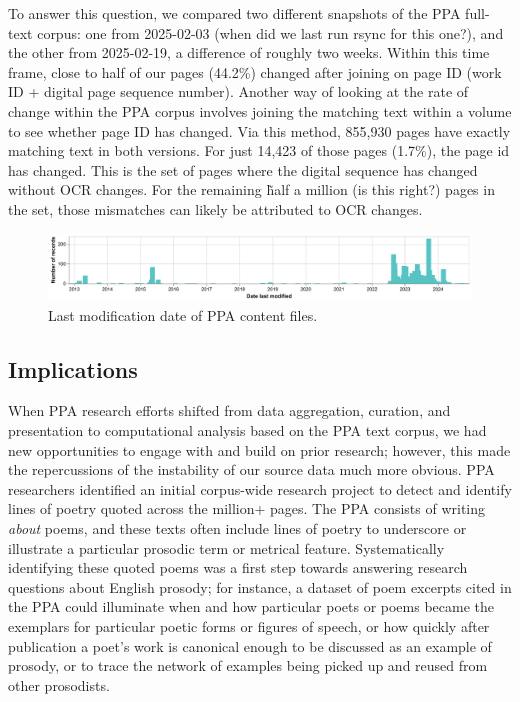 \documentclass{anthology-ch}         %
\begin{document}
To answer this question, we compared two different snapshots of the PPA full-text corpus: one from 2025-02-03 (when did we last run rsync for this one?), and the other from 2025-02-19, a difference of roughly two weeks. Within this time frame, close to half of our pages (44.2\%) changed after joining on page ID (work ID + digital page sequence number). Another way of looking at the rate of change within the PPA corpus involves joining the matching text within a volume to see whether page ID has changed. Via this method, 855,930 pages have exactly matching text in both versions. For just 14,423 of those pages (1.7\%), the page id has changed. This is the set of pages where the digital sequence has changed without OCR changes. For the remaining \~half a million (is this right?) pages in the set, those mismatches can likely be attributed to OCR changes.

\begin{figure}[t!]
    \centering
    \includegraphics[width=1\linewidth]{figures/ppa_hathitrust_lastmodified.pdf}
    \caption{Last modification date of PPA content files.}
    \label{fig:ppa-last-modified}
\end{figure}

\subsection{Implications}

When PPA research efforts shifted from data aggregation, curation, and presentation to computational analysis based on the PPA text corpus, we had new opportunities to engage with and build on prior research; however, this made the repercussions of the instability of our source data much more obvious. PPA researchers identified an initial corpus-wide research project to detect and identify lines of poetry quoted across the million+ pages. The PPA consists of writing \textit{about }poems, and these texts often include lines of poetry to underscore or illustrate a particular prosodic term or metrical feature. Systematically identifying these quoted poems was a first step towards answering research questions about English prosody; for instance, a dataset of poem excerpts cited in the PPA could illuminate when and how particular poets or poems became the exemplars for particular poetic forms or figures of speech, or how quickly after publication a poet’s work is canonical enough to be discussed as an example of prosody, or to trace the network of examples being picked up and reused from other prosodists.
\end{document}
